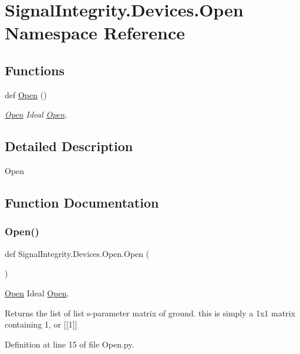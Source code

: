\hypertarget{namespaceSignalIntegrity_1_1Devices_1_1Open}{}\section{Signal\+Integrity.\+Devices.\+Open Namespace Reference}
\label{namespaceSignalIntegrity_1_1Devices_1_1Open}
\subsection*{Functions}
\begin{DoxyCompactItemize}
\item 
def \hyperlink{namespaceSignalIntegrity_1_1Devices_1_1Open_a620fa0b6871c826c7bb95af2d2aa0c00}{Open} ()
\begin{DoxyCompactList}\small\item\em \hyperlink{namespaceSignalIntegrity_1_1Devices_1_1Open}{Open} Ideal \hyperlink{namespaceSignalIntegrity_1_1Devices_1_1Open}{Open}. \end{DoxyCompactList}\end{DoxyCompactItemize}


\subsection{Detailed Description}
\begin{DoxyVerb}Open\end{DoxyVerb}
 

\subsection{Function Documentation}
\mbox{\label{namespaceSignalIntegrity_1_1Devices_1_1Open_a620fa0b6871c826c7bb95af2d2aa0c00}} 
\subsubsection{\texorpdfstring{Open()}{Open()}}
{\footnotesize\ttfamily def Signal\+Integrity.\+Devices.\+Open.\+Open (\begin{DoxyParamCaption}{ }\end{DoxyParamCaption})}



\hyperlink{namespaceSignalIntegrity_1_1Devices_1_1Open}{Open} Ideal \hyperlink{namespaceSignalIntegrity_1_1Devices_1_1Open}{Open}. 

\begin{DoxyReturn}{Returns}
the list of list s-\/parameter matrix of ground. this is simply a 1x1 matrix containing 1, or \mbox{[}\mbox{[}1\mbox{]}\mbox{]} 
\end{DoxyReturn}


Definition at line 15 of file Open.\+py.


